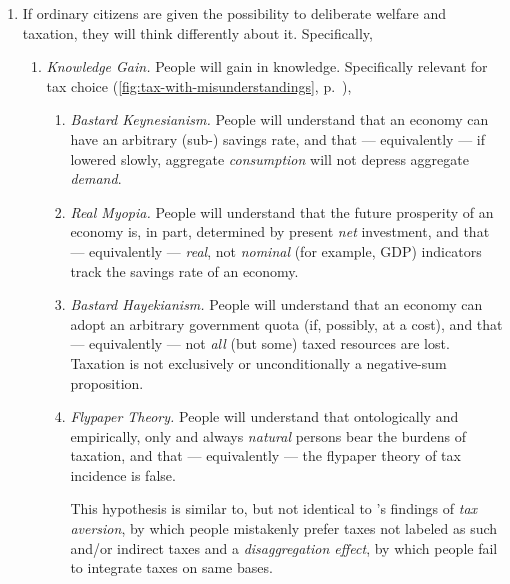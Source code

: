 \begin{enumerate}
    \item \label{itm:think-different}
		If ordinary citizens are given the possibility to deliberate welfare and taxation, they will think differently about it.
		Specifically,
		\begin{enumerate}
		
			\item \label{itm:knowledge-gain}
				\emph{Knowledge Gain.}
				People will gain in knowledge.
				Specifically relevant for tax choice (\autoref{fig:tax-with-misunderstandings}, p.~\pageref{fig:tax-with-misunderstandings}), %
				\begin{enumerate}
				
					\item \label{itm:bastard-keynesianism} 
						\emph{Bastard Keynesianism.}
						People will understand that an economy can have an arbitrary (sub-\citeauthor{Solow1956}) savings rate, and that --- equivalently --- if lowered slowly, aggregate \emph{consumption} will not depress aggregate \emph{demand}.
				
					\item \label{itm:real-myopia}
						\emph{Real Myopia.} %
						People will understand that the future prosperity of an economy is, in part, determined by present \emph{net} investment, and that --- equivalently --- \emph{real}, not \emph{nominal} (for example, \gls{GDP}) indicators track the savings rate of an economy.
				
					\item \label{itm:bastard-hayekianism} %
						\emph{Bastard Hayekianism.} %
						People will understand that an economy can adopt an arbitrary government quota (if, possibly, at a cost), and that --- equivalently --- not \emph{all} (but some) taxed resources are lost.
						Taxation is not exclusively or unconditionally a negative-sum proposition.
				
					\item \label{itm:flyper-theory} %
						\emph{Flypaper Theory.}
						People will understand that ontologically and empirically, only and always \emph{natural} persons bear the burdens of taxation, and that --- equivalently --- the flypaper theory of tax incidence is false.
						
						This hypothesis is similar to, but not identical to \citeauthor{McCafferyBaron2003}'s findings of \emph{tax aversion}, by which people mistakenly prefer taxes not labeled as such and/or indirect taxes and a \emph{disaggregation effect}, by which people fail to integrate taxes on same bases.
				

\end{enumerate}
\end{enumerate}
\end{enumerate}
